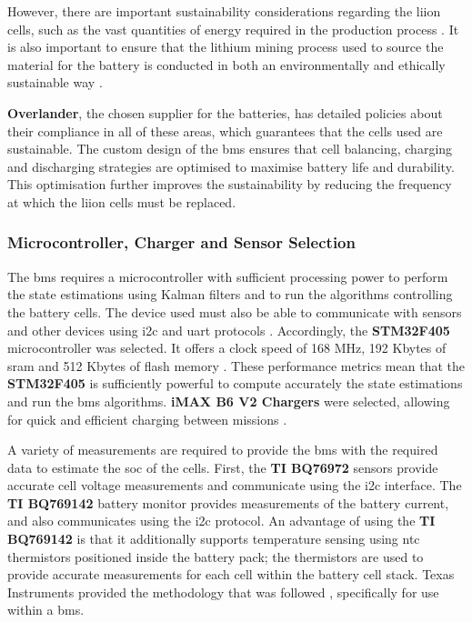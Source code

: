 However, there are important sustainability considerations regarding the \acrshort{liion} cells, such as the vast quantities of energy required in the production process \cite{environments12010024}. It is also important to ensure that the lithium mining process used to source the material for the battery is conducted in both an environmentally and ethically sustainable way \cite{EnergyFuturesLab_2022}. 

\textbf{Overlander}, the chosen supplier for the batteries, has detailed policies about their compliance in all of these areas, which guarantees that the cells used are sustainable. The custom design of the \gls{bms} ensures that cell balancing, charging and discharging strategies are optimised to maximise battery life and durability. This optimisation further improves the sustainability by reducing the frequency at which the \acrshort{liion} cells must be replaced. 

\subsubsection{Microcontroller, Charger and Sensor Selection}
\label{microcon}

The \acrshort{bms} requires a microcontroller with sufficient processing power to perform the state estimations using Kalman filters and to run the algorithms controlling the battery cells. The device used must also be able to communicate with sensors and other devices using \gls{i2c} and \gls{uart} protocols \cite{Denggao2022}. Accordingly, the \textbf{STM32F405} microcontroller was selected. It offers a clock speed of 168 MHz, 192 Kbytes of \gls{sram} and 512 Kbytes of flash memory \cite{st_dm00037051}. These performance metrics mean that the \textbf{STM32F405} is sufficiently powerful to compute accurately the state estimations and run the \acrshort{bms} algorithms. \textbf{iMAX B6 V2 Chargers} were selected, allowing for quick and efficient charging between missions \cite{digikey_prt16793}.

A variety of measurements are required to provide the \acrshort{bms} with the required data to estimate the \gls{soc} of the cells. First, the \textbf{TI BQ76972} sensors provide accurate cell voltage measurements and communicate using the \acrshort{i2c} interface. The \textbf{TI BQ769142} battery monitor provides measurements of the battery current, and also communicates using the \acrshort{i2c} protocol. An advantage of using the \textbf{TI BQ769142} is that it additionally supports temperature sensing using \gls{ntc} thermistors positioned inside the battery pack; the thermistors are used to provide accurate measurements for each cell within the battery cell stack. Texas Instruments provided the methodology that was followed \cite{TI_SNIA032}, specifically for use within a \gls{bms}.

